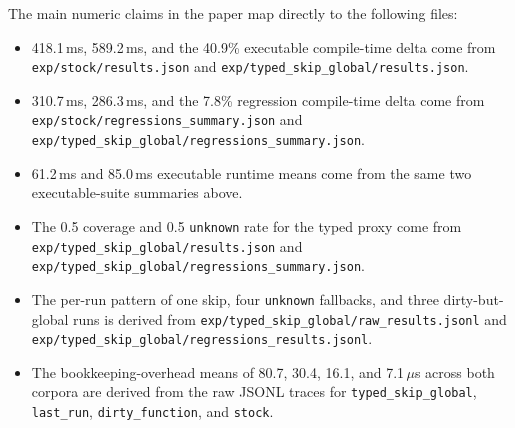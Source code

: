 \documentclass{article}
\begin{document}
The main numeric claims in the paper map directly to the following files:
\begin{itemize}
  \item 418.1\,ms, 589.2\,ms, and the 40.9\% executable compile-time delta come from \texttt{exp/stock/results.json} and \texttt{exp/typed\_skip\_global/results.json}.
  \item 310.7\,ms, 286.3\,ms, and the 7.8\% regression compile-time delta come from \texttt{exp/stock/regressions\_summary.json} and \texttt{exp/typed\_skip\_global/regressions\_summary.json}.
  \item 61.2\,ms and 85.0\,ms executable runtime means come from the same two executable-suite summaries above.
  \item The 0.5 coverage and 0.5 \texttt{unknown} rate for the typed proxy come from \texttt{exp/typed\_skip\_global/results.json} and \texttt{exp/typed\_skip\_global/regressions\_summary.json}.
  \item The per-run pattern of one skip, four \texttt{unknown} fallbacks, and three dirty-but-global runs is derived from \texttt{exp/typed\_skip\_global/raw\_results.jsonl} and \texttt{exp/typed\_skip\_global/regressions\_results.jsonl}.
  \item The bookkeeping-overhead means of 80.7, 30.4, 16.1, and 7.1\,$\mu$s across both corpora are derived from the raw JSONL traces for \texttt{typed\_skip\_global}, \texttt{last\_run}, \texttt{dirty\_function}, and \texttt{stock}.
\end{itemize}
\end{document}
